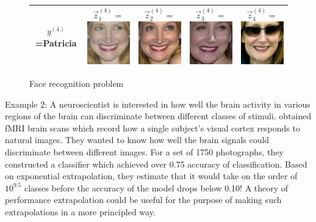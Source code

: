 \documentclass[12pt]{article}
\begin{document}
\begin{figure}
\begin{tabular}{|c|ccc|c|}
$y^{(4)}$=Patricia & 
  $\vec{z}_1^{(4)} = $\includegraphics[scale = 0.2]{face_photos/Patricia_Clarkson_0001.png} &  
  $\vec{z}_2^{(4)} = $\includegraphics[scale = 0.2]{face_photos/Patricia_Clarkson_0002.png} &  
  $\vec{z}_3^{(4)} = $\includegraphics[scale = 0.2]{face_photos/Patricia_Clarkson_0003.png} &  
  $\vec{z}_4^{(4)} = $\includegraphics[scale = 0.2]{face_photos/Patricia_Clarkson_0004.png} \\ \hline
\end{tabular}
\caption{Face recognition problem}
\label{fig:face_rec}
\end{figure}

Example 2: A neuroscientist is interested in how well the brain
  activity in various regions of the brain can discriminate between
  different classes of stimuli.  \cite{Kay2008a} obtained fMRI brain
  scans which record how a single subject's visual cortex responds to
  natural images. They wanted to know how well the brain signals could
  discriminate between different images. For a set of 1750
  photographs, they constructed a classifier which achieved over 0.75
  accuracy of classification. Based on exponential extrapolation, they
  estimate that it would take on the order of $10^{9.5}$ classes
  before the accuracy of the model drops below 0.10!  A theory of
  performance extrapolation could be useful for the purpose of making
  such extrapolations in a more principled way.
  
\end{document}
